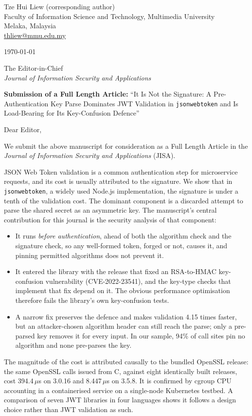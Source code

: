 \documentclass[11pt,a4paper]{article}
\begin{document}
\noindent
Tze Hui Liew (corresponding author)\\
Faculty of Information Science and Technology, Multimedia University\\
Melaka, Malaysia\\
\href{mailto:thliew@mmu.edu.my}{thliew@mmu.edu.my}

\medskip
\noindent\today

\medskip
\noindent
The Editor-in-Chief\\
\emph{Journal of Information Security and Applications}

\medskip
\noindent
\textbf{Submission of a Full Length Article:} ``It Is Not the Signature: A Pre-Authentication Key Parse Dominates
JWT Validation in \texttt{jsonwebtoken} and Is Load-Bearing for Its Key-Confusion Defence''

Dear Editor,

We submit the above manuscript for consideration as a Full Length Article in
the \emph{Journal of Information Security and Applications} (JISA).

JSON Web Token validation is a common authentication step for microservice
requests, and its cost is usually attributed to the signature. We show that in
\texttt{jsonwebtoken}, a widely used Node.js implementation, the signature is
under a tenth of the validation cost. The dominant component is a discarded
attempt to parse the shared secret as an asymmetric key. The manuscript's
central contribution for this journal is the security analysis of that
component:
\begin{itemize}
\item It runs \emph{before authentication}, ahead of both the algorithm check
  and the signature check, so any well-formed token, forged or not, causes it,
  and pinning permitted algorithms does not prevent it.
\item It entered the library with the release that fixed an RSA-to-HMAC
  key-confusion vulnerability (CVE-2022-23541), and the key-type checks that
  implement that fix depend on it. The obvious performance optimisation
  therefore fails the library's own key-confusion tests.
\item A narrow fix preserves the defence and makes validation 4.15 times
  faster, but an attacker-chosen algorithm header can still reach the parse;
  only a pre-parsed key removes it for every input. In our sample, 94\% of
  call sites pin no algorithm and none pre-parses the key.
\end{itemize}
The magnitude of the cost is attributed causally to the bundled OpenSSL
release: the same OpenSSL calls issued from C, against eight identically built
releases, cost 394.4\,$\mu$s on 3.0.16 and 8.447\,$\mu$s on 3.5.8. It is confirmed by
cgroup CPU accounting in a containerised service on a single-node Kubernetes
testbed. A comparison of seven JWT libraries in four languages shows it follows
a design choice rather than JWT validation as such.
\end{document}
